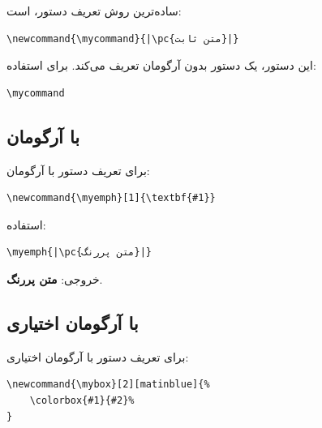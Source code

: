 ساده‌ترین روش تعریف دستور، 
است:

\begin{latin}
\begin{verbatim}
\newcommand{\mycommand}{|\pc{متن ثابت}|}
\end{verbatim}
\end{latin}

این دستور، یک دستور بدون آرگومان تعریف
می‌کند. برای استفاده:

\begin{latin}
\begin{verbatim}
\mycommand
\end{verbatim}
\end{latin}


\subsection{با آرگومان}
\label{sec:custom-commands-args}

برای تعریف دستور با آرگومان:

\begin{latin}
\begin{verbatim}
\newcommand{\myemph}[1]{\textbf{#1}}
\end{verbatim}
\end{latin}

استفاده:

\begin{latin}
\begin{verbatim}
\myemph{|\pc{متن پررنگ}|}
\end{verbatim}
\end{latin}

خروجی: \textbf{متن پررنگ}.


\subsection{با آرگومان اختیاری}
\label{sec:custom-commands-optional}

برای تعریف دستور با آرگومان اختیاری:

\begin{latin}
\begin{verbatim}
\newcommand{\mybox}[2][matinblue]{%
    \colorbox{#1}{#2}%
}
\end{verbatim}
\end{latin}

